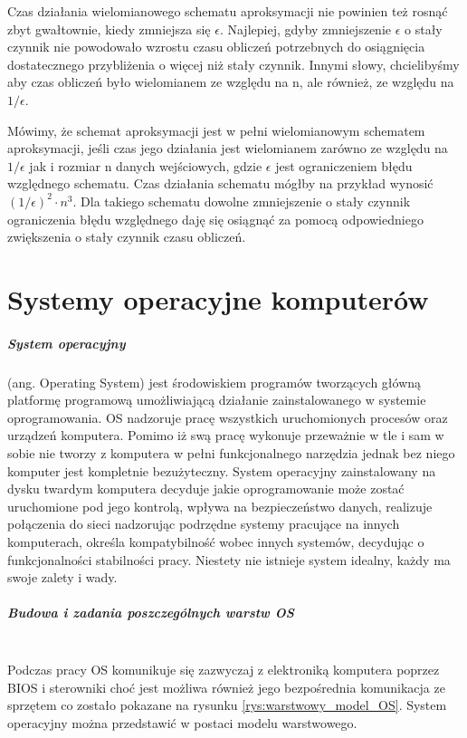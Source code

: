 \documentclass[]{report}
\begin{document}
Czas działania wielomianowego schematu aproksymacji nie powinien też rosnąć zbyt gwałtownie, kiedy zmniejsza się $\epsilon$. Najlepiej, gdyby zmniejszenie  $\epsilon$ o stały czynnik nie powodowało wzrostu czasu obliczeń potrzebnych do osiągnięcia dostatecznego przybliżenia o więcej niż stały czynnik. Innymi słowy, chcielibyśmy aby czas obliczeń było wielomianem ze względu na n, ale również, ze względu na $1/\epsilon$.

Mówimy, że schemat aproksymacji jest w pełni wielomianowym schematem aproksymacji, jeśli czas jego działania jest wielomianem zarówno ze względu na $1/\epsilon$ jak i rozmiar n danych wejściowych, gdzie $\epsilon$ jest ograniczeniem błędu względnego schematu. Czas działania schematu mógłby na przykład wynosić $ (1/\epsilon)^2 \cdot n^3 $. Dla takiego schematu dowolne zmniejszenie o stały czynnik ograniczenia błędu względnego daję się osiągnąć za pomocą odpowiedniego zwiększenia o stały czynnik czasu obliczeń.



\chapter{Systemy operacyjne komputerów}

\paragraph{System operacyjny}
(ang. Operating System) jest środowiskiem programów tworzących główną platformę programową umożliwiającą działanie zainstalowanego w systemie oprogramowania. OS nadzoruje pracę wszystkich uruchomionych procesów oraz urządzeń komputera. Pomimo iż swą pracę wykonuje przeważnie w tle i sam w sobie nie tworzy z komputera w pełni funkcjonalnego narzędzia jednak bez niego komputer jest kompletnie bezużyteczny. System operacyjny zainstalowany na dysku twardym komputera decyduje jakie oprogramowanie może zostać uruchomione pod jego kontrolą, wpływa na bezpieczeństwo danych, realizuje połączenia do sieci nadzorując podrzędne systemy pracujące na innych komputerach, określa kompatybilność wobec innych systemów, decydując o funkcjonalności stabilności pracy. Niestety nie istnieje system idealny, każdy ma swoje zalety i wady.

\paragraph{Budowa i zadania poszczególnych warstw OS\\\\}
Podczas pracy OS komunikuje się zazwyczaj z elektroniką komputera poprzez BIOS i sterowniki choć jest możliwa również jego bezpośrednia komunikacja ze sprzętem co zostało pokazane na rysunku \ref{rys:warstwowy_model_OS}. System operacyjny można przedstawić w postaci modelu warstwowego.
\end{document}
